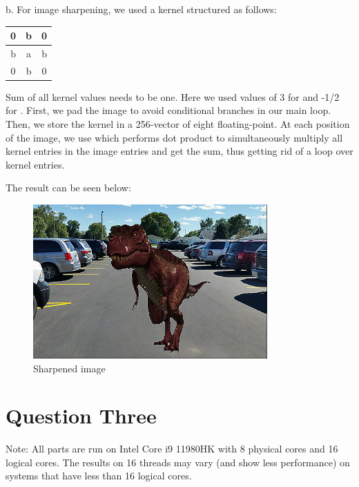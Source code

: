 \documentclass[12pt]{article}
\begin{document}
b. For image sharpening, we used a kernel structured as follows:

\begin{table}[ht!]
	\centering
\begin{tabular}{|c|c|c|}
	\hline
	0 & b & 0 \\ \hline
	b & a & b \\ \hline
	0 & b & 0 \\ \hline
\end{tabular}
\end{table}

Sum of all kernel values needs to be one. Here we used values of 3 for  and -1/2 for .
First, we pad the image to avoid conditional branches in our main loop. Then, we store the kernel in a 256-vector of eight floating-point. At each position of the image, we use  which performs dot product to simultaneously multiply all kernel entries in the image entries and get the sum, thus getting rid of a loop over kernel entries.

The result can be seen below:

\begin{figure}[H]
	\centering
	\includegraphics[width=0.8\textwidth]{./images/Q2/sharpened.bmp}	
	\cprotect\caption{Sharpened image}
	\label{fig:2-2}
\end{figure}


\newpage

\section{Question Three}

Note: All parts are run on Intel Core i9 11980HK with 8 physical cores and 16 logical cores. The results on 16 threads may vary (and show less performance) on systems that have less than 16 logical cores.
\end{document}
